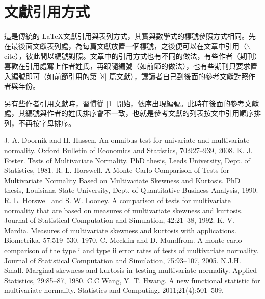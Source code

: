 \section{文獻引用方式}
這是傳統的 \LaTeX 文獻引用與表列方式，其實與數學式的標號參照方式相同。先在最後面文獻表列處，為每篇文獻放置一個標號，之後便可以在文章中引用（$\backslash$cite），彼此間以編號對照。文章中的引用方式也有不同的做法，有些作者（期刊）喜歡在引用處寫上作者姓氏，再跟隨編號（如前節的做法），也有些期刊只要求置入編號即可（如前節引用的第  [8] 篇文獻），讓讀者自己到後面的參考文獻對照作者與年份。

另有些作者引用文獻時，習慣從 [1] 開始，依序出現編號。此時在後面的參考文獻處，其編號與作者的姓氏排序會不一致，也就是參考文獻的列表按文中引用順序排列，不再按字母排序。

\begin{thebibliography}{99} %
J. A. Doornik and H. Hassen. An omnibus test for univariate and multivariate normality.
Oxford Bulletin of Economics and Statistics, 70:927–939, 2008.
K. J. Foster. Tests of Multivariate Normality. PhD thesis, Leeds University, Dept.
of Statistics, 1981.
R. L. Horswell. A Monte Carlo Comparison of Tests for Multivariate Normality
Based on Multivariate Skewness and Kurtosis. PhD thesis, Louisiana State University,
Dept. of Quantitative Business Analysis, 1990.
R. L. Horswell and S. W. Looney. A comparison of tests for multivariate normality
that are based on measures of multivariate skewness and kurtosis. Journal of
Statistical Computation and Simulation, 42:21–38, 1992.
K. V. Mardia. Measures of multivariate skewness and kurtosis with applications.
Biometrika, 57:519–530, 1970.
C. Mecklin and D. Mundfrom. A monte carlo comparison of the type i and type ii
error rates of tests of multivariate normality. Journal of Statistical Computation and
Simulation, 75:93–107, 2005.
N.J.H. Small. Marginal skewness and kurtosis in testing multivariate normality.
Applied Statistics, 29:85–87, 1980.
C.C Wang, Y. T. Hwang. A new functional statistic for multivariate normality. Statistics
and Computing. 2011;21(4):501–509.
\end{thebibliography}



